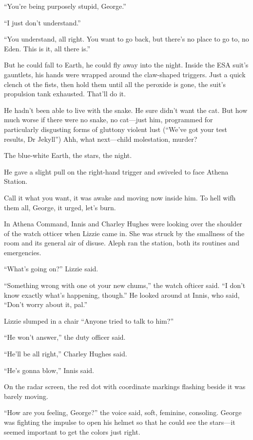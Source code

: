 ``You're being purposely stupid, George.''

``I just don't understand.''

``You understand, all right. You want to go back, but there's no place to go to, no Eden. This is it, all there is.''

But he could fall to Earth, he could fly away into the night. Inside the ESA suit's gauntlets, his hands were wrapped around the claw-shaped triggers. Just a quick clench ot the fists, then hold them until all the peroxide is gone, the suit's propulsion tank exhausted. That'll do it.

He hadn't been able to live with the snake. He sure didn't want the cat. But how much worse if there were no snake, no cat—just him, programmed for particularly disgusting forms of gluttony violent lust (``We've got your test results, Dr Jekyll'') Ahh, what next—child molestation, murder?

The blue-white Earth, the stars, the night.

He gave a slight pull on the right-hand trigger and swiveled to face Athena Station.

Call it what you want, it was awake and moving now inside him. To hell wifh them all, George, it urged, let's burn.

In Athena Command, Innis and Charley Hughes were looking over the shoulder of the watch otticer when Lizzie came in. She was struck by the smallness of the room and its general air of disuse. Aleph ran the station, both its routines and emergencies.

``What's going on?'' Lizzie said.

``Something wrong with one ot your new chums,'' the watch ofticer said. ``I don't know exactly what's happening, though.'' He looked around at Innis, who said, ``Don't worry about it, pal.''

Lizzie slumped in a chair ``Anyone tried to talk to him?''

``He won't answer,'' the duty officer said.

``He'll be all right,'' Charley Hughes said.

``He's gonna blow,'' Innis said.

On the radar screen, the red dot with coordinate markings flashing beside it was barely moving.

``How are you feeling, George?'' the voice said, soft, feminine, consoling. George was fighting the impulse to open his helmet so that he could see the stars—it seemed important to get the colors just right.

